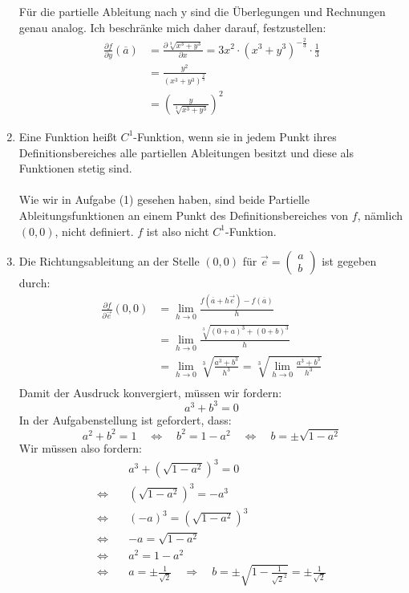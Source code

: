 \documentclass[a4paper,german,12pt,smallheadings]{scrartcl}
\begin{document}
\begin{enumerate}[(1)]
Für die partielle Ableitung nach y sind die Überlegungen und Rechnungen genau analog. Ich beschränke mich daher darauf, festzustellen:
\begin{align*}
\frac{\partial f}{\partial y}(\overline{a})&=\frac{\partial \sqrt[3]{x^3+y^3}}{\partial x}=3x^2\cdot\left(x^3+y^3\right)^{-\frac{2}{3}}\cdot \frac{1}{3}\\
&=\frac{y^2}{(x^3+y^3)^{\frac{2}{3}}}\\
&=\left(\frac{y}{\sqrt[3]{x^3+y^3}}\right)^2
\end{align*}

\item Eine Funktion heißt $C^1$-Funktion, wenn sie in jedem Punkt ihres Definitionsbereiches alle partiellen Ableitungen besitzt und diese als Funktionen stetig sind.\\
\\
Wie wir in Aufgabe (1) gesehen haben, sind beide Partielle Ableitungsfunktionen an einem Punkt des Definitionsbereiches von $f$, nämlich $(0,0)$, nicht definiert. $f$ ist also nicht $C^1$-Funktion.

\item Die Richtungsableitung an der Stelle $(0,0)$ für $\vec{e}=\begin{pmatrix}
a\\b
\end{pmatrix}$ ist gegeben durch:
\begin{align*}
\frac{\partial f}{\partial \vec{e}}(0,0)&=\lim\limits_{h\to 0}\frac{f(\overline{a}+h\vec{e})-f(\overline{a})}{h}\\
&=\lim\limits_{h\to 0}\frac{\sqrt[3]{(0+a)^3+(0+b)^3}}{h}\\
&=\lim\limits_{h\to 0}\sqrt[3]{\frac{a^3+b^3}{h^3}}=\sqrt[3]{\lim\limits_{h\to 0}\frac{a^3+b^3}{h^3}}\\
\end{align*}
Damit der Ausdruck konvergiert, müssen wir fordern:
\begin{equation*}
a^3+b^3=0
\end{equation*}
In der Aufgabenstellung ist gefordert, dass:
\begin{equation*}
a^2+b^2=1 \quad \Leftrightarrow \quad b^2=1-a^2 \quad \Leftrightarrow \quad b=\pm\sqrt{1-a^2}
\end{equation*}
Wir müssen also fordern:
\begin{align*}
& a^3+(\sqrt{1-a^2})^3=0\\
\Leftrightarrow \quad & (\sqrt{1-a^2})^3=-a^3\\
\Leftrightarrow \quad & (-a)^3=(\sqrt{1-a^2})^3\\
\Leftrightarrow \quad & -a=\sqrt{1-a^2}\\
\Leftrightarrow \quad & a^2=1-a^2\\
\Leftrightarrow \quad & a=\pm\frac{1}{\sqrt{2}} \quad \Rightarrow \quad b=\pm\sqrt{1-\frac{1}{\sqrt{2}^2}}=\pm\frac{1}{\sqrt{2}}
\end{align*}


\end{enumerate}
\end{document}
